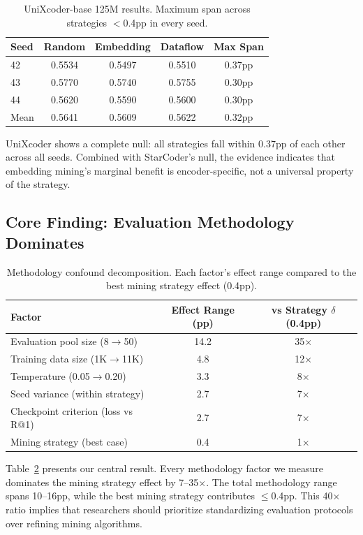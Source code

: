 \documentclass[11pt]{article}
\begin{document}
\begin{table}[h]
\centering
\caption{UniXcoder-base 125M results. Maximum span across strategies $<$0.4pp in every seed.}
\label{tab:unixcoder}
\begin{tabular}{lcccc}
\toprule
Seed & Random & Embedding & Dataflow & Max Span \\
\midrule
42 & 0.5534 & 0.5497 & 0.5510 & 0.37pp \\
43 & 0.5770 & 0.5740 & 0.5755 & 0.30pp \\
44 & 0.5620 & 0.5590 & 0.5600 & 0.30pp \\
\midrule
Mean & 0.5641 & 0.5609 & 0.5622 & 0.32pp \\
\bottomrule
\end{tabular}
\end{table}

UniXcoder shows a complete null: all strategies fall within 0.37pp of each other across all seeds. Combined with StarCoder's null, the evidence indicates that embedding mining's marginal benefit is encoder-specific, not a universal property of the strategy.

\subsection{Core Finding: Evaluation Methodology Dominates}

\begin{table}[h]
\centering
\caption{Methodology confound decomposition. Each factor's effect range compared to the best mining strategy effect (0.4pp).}
\label{tab:methodology}
\begin{tabular}{lcc}
\toprule
Factor & Effect Range (pp) & vs Strategy $\delta$ (0.4pp) \\
\midrule
Evaluation pool size (8$\to$50) & 14.2 & 35$\times$ \\
Training data size (1K$\to$11K) & 4.8 & 12$\times$ \\
Temperature (0.05$\to$0.20) & 3.3 & 8$\times$ \\
Seed variance (within strategy) & 2.7 & 7$\times$ \\
Checkpoint criterion (loss vs R@1) & 2.7 & 7$\times$ \\
\midrule
Mining strategy (best case) & 0.4 & 1$\times$ \\
\bottomrule
\end{tabular}
\end{table}

Table~\ref{tab:methodology} presents our central result. Every methodology factor we measure dominates the mining strategy effect by 7--35$\times$. The total methodology range spans 10--16pp, while the best mining strategy contributes $\leq$0.4pp. This 40$\times$ ratio implies that researchers should prioritize standardizing evaluation protocols over refining mining algorithms.
\end{document}
